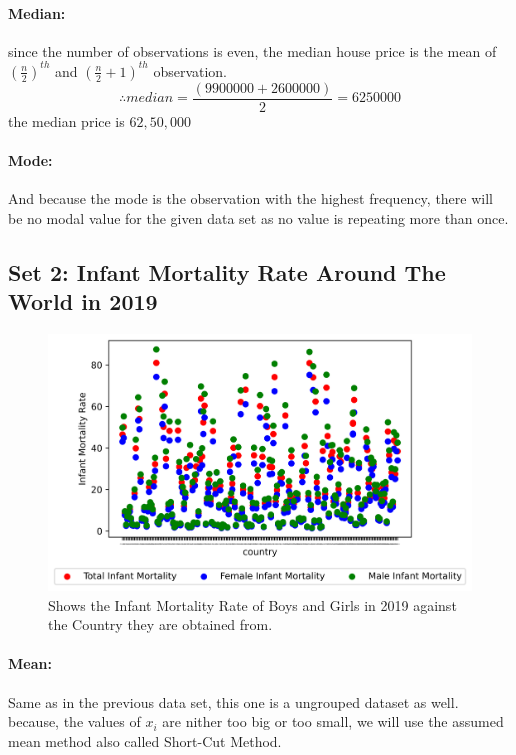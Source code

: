 \documentclass[12pt]{article}
\begin{document}
\paragraph{Median: }
since the number of observations is even, the median house price is the mean of $\left(\frac{n}{2}\right)^{th}$ and $\left(\frac{n}{2} + 1 \right)^{th}$ observation.
$$\therefore median = \frac{\left(9900000 + 2600000\right)}{2} = 6250000$$
the median price is \rupee $62,50,000$ \\
\paragraph{Mode: }
And because the mode is the observation with the highest frequency, there will be no modal value for the given data set as no value is repeating more than once.

\pagebreak

\subsection{Set 2: Infant Mortality Rate Around The World in 2019}

\begin{figure}[h]
\centering
\includegraphics[width=15cm]{Infant Mortality Rate}
\caption{Shows the Infant Mortality Rate of Boys and Girls in 2019 against the Country they are obtained from.}
\end{figure}

\paragraph{Mean: }
Same as in the previous data set, this one is a ungrouped dataset as well.\\
because, the values of $x_i$ are nither too big or too small, we will use the assumed mean method also called Short-Cut Method.
\end{document}
